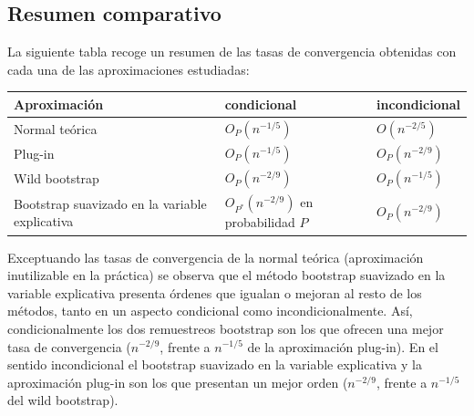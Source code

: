 \documentclass[
]{book}
\newcounter{none} %
\theoremstyle{break}
\theoremstyle{nonumberplain}
\begin{document}
\subsection{Resumen comparativo}\label{resumen-comparativo}

La siguiente tabla recoge un resumen de las tasas de convergencia
obtenidas con cada una de las aproximaciones estudiadas:

{\def\LTcaptype{none} %
\begin{longtable}[]{@{}
  >{\raggedright\arraybackslash}p{}
  >{\raggedright\arraybackslash}p{}
  >{\raggedright\arraybackslash}p{}@{}}
\toprule\noalign{}
\begin{minipage}[b]{\linewidth}\raggedright
Aproximación
\end{minipage} & \begin{minipage}[b]{\linewidth}\raggedright
condicional
\end{minipage} & \begin{minipage}[b]{\linewidth}\raggedright
incondicional
\end{minipage} \\
\midrule\noalign{}
\endhead
\bottomrule\noalign{}
\endlastfoot
Normal teórica & \(O_{P}\left( n^{-1/5}\right)\) & \(O\left(n^{-2/5}\right)\) \\
Plug-in & \(O_{P}\left( n^{-1/5}\right)\) & \(O_{P}\left( n^{-2/9}\right)\) \\
Wild bootstrap & \(O_{P}\left( n^{-2/9}\right)\) & \(O_{P}\left(n^{-1/5}\right)\) \\
Bootstrap suavizado
en la variable
explicativa & \(O_{P^{\ast}}\left( n^{-2/9}\right)\)
en probabilidad \(P\) & \(O_{P}\left(n^{-2/9}\right)\) \\
\end{longtable}
}

Exceptuando las tasas de convergencia de la normal teórica (aproximación
inutilizable en la práctica) se observa que el método bootstrap
suavizado en la variable explicativa presenta órdenes que igualan o
mejoran al resto de los métodos, tanto en un aspecto condicional como
incondicionalmente. Así, condicionalmente los dos remuestreos bootstrap
son los que ofrecen una mejor tasa de convergencia (\(n^{-2/9}\),
frente a \(n^{-1/5}\) de la aproximación plug-in). En el
sentido incondicional el bootstrap suavizado en la variable explicativa
y la aproximación plug-in son los que presentan un mejor orden
(\(n^{-2/9}\), frente a \(n^{-1/5}\) del wild bootstrap).
\end{document}
